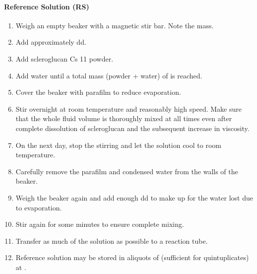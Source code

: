 \paragraph{Reference Solution (RS)}
\begin{enumerate}
	\item Weigh an empty  beaker with a magnetic stir bar. Note the mass.
	\item Add approximately  dd.
	\item Add  scleroglucan Cs 11 powder.
	\item Add water until a total mass (powder + water) of  is reached.
	\item Cover the beaker with parafilm to reduce evaporation.
	\item Stir overnight at room temperature and reasonably high speed. Make sure that the whole fluid volume is thoroughly mixed at all times even after complete dissolution of scleroglucan and the subsequent increase in viscosity.
	\item On the next day, stop the stirring and let the solution cool to room temperature.
	\item Carefully remove the parafilm and condensed water from the walls of the beaker.
	\item Weigh the beaker again and add enough dd to make up for the water lost due to evaporation.
	\item Stir again for some minutes to ensure complete mixing.
	\item Transfer as much of the solution as possible to a  reaction tube.
	\item Reference solution may be stored in aliquots of  (sufficient for quintuplicates) at .
	\setcounter{sirofluor-protocol}{\value{enumi}}
\end{enumerate}

